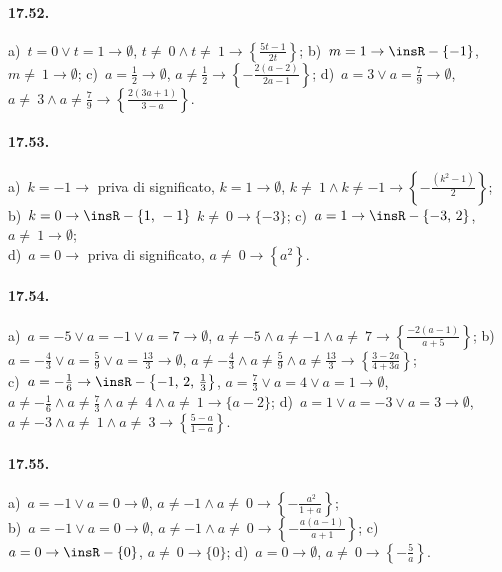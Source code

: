 \paragraph{17.52.}
a)~$t=0\vee t=1 \rightarrow \emptyset$, $t\neq~0\wedge t\neq~1 \rightarrow \left\{\frac{5t-1}{2t}\right\}$;
\quad b)~$m=1 \rightarrow \insR-\{-1\}$, $m\neq~1 \rightarrow \emptyset$;
\quad c)~$a=\frac{1}{2} \rightarrow \emptyset$, $a\neq \frac{1}{2} \rightarrow \left\{-{\frac{2(a-2)}{2a-1}}\right\}$;
\quad d)~$a=3\vee a=\frac{7}{9} \rightarrow \emptyset$, $a\neq~3\wedge a\neq \frac{7}{9} \rightarrow \left\{\frac{2(3a+1)}{3-a}\right\}$.

\paragraph{17.53.}
a)~$k=-1 \rightarrow$ priva di significato, $k=1 \rightarrow \emptyset$, $k\neq~1\wedge k\neq -1 \rightarrow \left\{-{\frac{\left(k^2-1\right)}{2}}\right\}$;
\protect\\ b)~$k=0 \rightarrow \insR-\{1\text{,~}-1\}$ $k\neq~0 \rightarrow \{-3\}$; \quad c)~$a=1 \rightarrow \insR-\{-3\text{,~}2\}$, $a\neq~1 \rightarrow \emptyset$;
\protect\\ d)~$a=0 \rightarrow$ priva di significato, $a\neq~0 \rightarrow \left\{a^{2}\right\}$.

\paragraph{17.54.}
a)~$a=-5\vee a=-1\vee a=7 \rightarrow \emptyset$, $a\neq -5\wedge a\neq -1\wedge a\neq~7 \rightarrow \left\{\frac{-2(a-1)}{a+5}\right\}$;
\quad b)~$a=-{\frac{4}{3}}\vee a=\frac{5}{9}\vee a=\frac{13}{3} \rightarrow \emptyset$, $a\neq -{\frac{4}{3}}\wedge a\neq \frac{5}{9}\wedge a\neq \frac{13}{3} \rightarrow \left\{\frac{3-2a}{4+3a}\right\}$;
\protect\\ c)~$a=-{\frac{1}{6}} \rightarrow \insR-\left\{-1\text{,~}2\text{,~}\frac{1}{3}\right\}$, $a=\frac{7}{3}\vee a=4\vee a=1 \rightarrow \emptyset$, $a\neq -{\frac{1}{6}}\wedge a\neq \frac{7}{3}\wedge a\neq~4\wedge a\neq~1 \rightarrow \{a-2\}$;
\quad d)~$a=1\vee a=-3\vee a=3 \rightarrow \emptyset$, $a\neq -3\wedge a\neq~1\wedge a\neq~3 \rightarrow \left\{\frac{5-a}{1-a}\right\}$.

\paragraph{17.55.}
a)~$a=-1\vee a=0 \rightarrow \emptyset$, $a\neq -1\wedge a\neq~0 \rightarrow \left\{-{\frac{\ a^{2}}{1+a}}\right\}$;
\protect\\ b)~$a=-1\vee a=0 \rightarrow \emptyset$, $a\neq -1\wedge a\neq~0 \rightarrow \left\{-{\frac{a(a-1)}{a+1}}\right\}$;
\quad c)~$a=0 \rightarrow \insR-\{0\}$, $a\neq~0 \rightarrow \{0\}$;
\quad d)~$a=0 \rightarrow \emptyset$, $a\neq~0 \rightarrow \left\{-{\frac{5}{a}}\right\}$.

